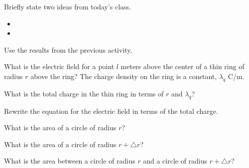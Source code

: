 \postClass

\begin{problem}
\item Briefly state two ideas from today's class.
  \begin{itemize}
  \item
  \item
  \end{itemize}
\end{problem}


\begin{problem}
\item Use the results from the previous activity.
  \begin{subproblem}
  \item What is the electric field for a point $l$ meters above the center of a thin ring of radius $r$ above the ring?
    The charge density on the ring is a constant, $\lambda_q$ C/m.
    \vfill
  \item What is the total charge in the thin ring in terms of $r$ and $\lambda_q$?
    \vfill
  \item Rewrite the equation for the electric field in terms of the total charge.
    \vfill
  \item What is the area of a circle of radius $r$?
    \vfill
  \item What is the area of a circle of radius $r+\triangle r$?
      \vfill
  \item What is the area between a circle of radius $r$ and a circle of radius $r+\triangle r$?
      \vfill

  \end{subproblem}
\end{problem}



